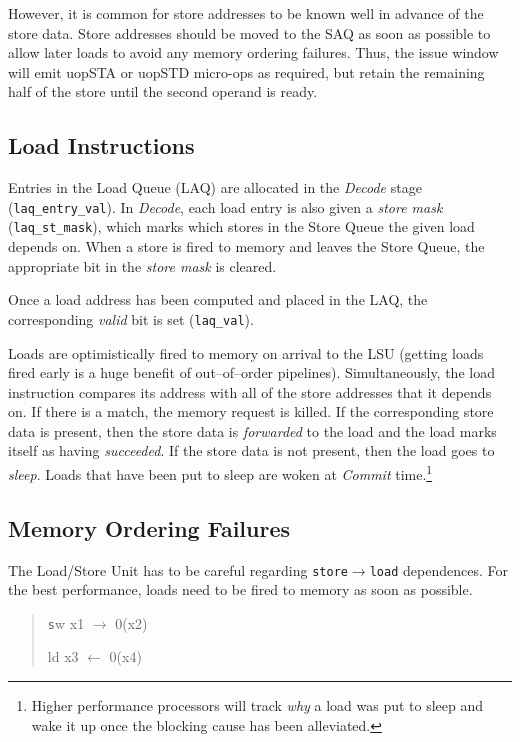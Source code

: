 However, it is common for store addresses to be known well in advance of the store data.  Store addresses should be moved to the SAQ as soon as possible to allow later loads to avoid any memory ordering failures. Thus, the issue window will emit uopSTA or uopSTD micro-ops as required, but retain the remaining half of the store until the second operand is ready.

\subsection{Load Instructions}

Entries in the Load Queue (LAQ) are allocated in the {\em Decode} stage ({\tt laq\_entry\_val}).  In {\em Decode}, each load entry is also given a {\em store mask} ({\tt laq\_st\_mask}), which marks which stores in the Store Queue the given load depends on.  When a store is fired to memory and leaves the Store Queue, the appropriate bit in the {\em store mask} is cleared.

Once a load address has been computed and placed in the LAQ, the corresponding {\em valid} bit is set ({\tt laq\_val}). 

Loads are optimistically fired to memory on arrival to the LSU (getting loads fired early is a huge benefit of out--of--order pipelines).  Simultaneously, the load instruction compares its address with all of the store addresses that it depends on.  If there is a match, the memory request is killed.  If the corresponding store data is present, then the store data is {\em forwarded} to the load and the load marks itself as having {\em succeeded}.  If the store data is not present, then the load goes to {\em sleep}.  Loads that have been put to sleep are woken at {\em Commit} time.\footnote{Higher performance processors will track {\em why} a load was put to sleep and wake it up once the blocking cause has been alleviated.}


\subsection{Memory Ordering Failures}

The Load/Store Unit has to be careful regarding {\tt store$\rightarrow$load} dependences.  For the best performance, loads need to be fired to memory as soon as possible. 

\begin{quote}

{\texttt
sw x1 $\rightarrow$ 0(x2)

ld x3 $\leftarrow$ 0(x4)
}

\end{quote}


